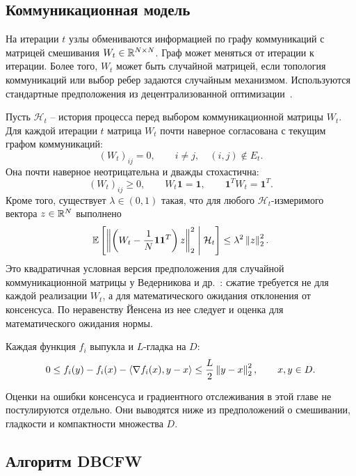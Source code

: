 \subsection{Коммуникационная модель}

На итерации $t$ узлы обмениваются информацией по графу коммуникаций с матрицей смешивания $W_t\in\mathbb{R}^{N\times N}$.
Граф может меняться от итерации к итерации.
Более того, $W_t$ может быть случайной матрицей, если топология коммуникаций или выбор ребер задаются случайным механизмом.
Используются стандартные предположения из децентрализованной оптимизации~\cite{wai2017decentralized,vedernikov2023decentralized}.

\begin{assumption}
\label{ass:dbcfw-mixing}
Пусть $\mathcal H_t$ -- история процесса перед выбором коммуникационной матрицы $W_t$.
Для каждой итерации $t$ матрица $W_t$ почти наверное согласована с текущим графом
коммуникаций:
\[
    (W_t)_{ij}=0,
    \qquad
    i\neq j,\quad (i,j)\notin E_t.
\]
Она почти наверное неотрицательна и дважды стохастична:
\[
    (W_t)_{ij}\geq0,
    \qquad
    W_t\mathbf{1}=\mathbf{1},
    \qquad
    \mathbf{1}^TW_t=\mathbf{1}^T.
\]
Кроме того, существует $\lambda\in(0,1)$ такая, что для любого
$\mathcal H_t$-измеримого вектора $z\in\mathbb{R}^N$ выполнено
\[
    \mathbb{E}\left[
        \left\|
        \left(W_t-\frac{1}{N}\mathbf{1}\mathbf{1}^T\right)z
        \right\|_2^2
        \;\middle|\;\mathcal H_t
    \right]
    \leq
    \lambda^2\left\|z\right\|_2^2.
\]
Это квадратичная условная версия предположения для случайной коммуникационной матрицы
у Ведерникова и др.~\cite{vedernikov2023decentralized}: сжатие требуется не для каждой
реализации $W_t$, а для математического ожидания отклонения от консенсуса.
По неравенству Йенсена из нее следует и оценка для математического ожидания нормы.
\end{assumption}

\begin{assumption}
\label{ass:dbcfw-smooth}
Каждая функция $f_i$ выпукла и $L$-гладка на $D$:
\[
    0
    \leq
    f_i(y)-f_i(x)-\left\langle \nabla f_i(x), y-x \right\rangle
    \leq
    \frac{L}{2}\left\|y-x\right\|_2^2,
    \qquad
    x,y\in D.
\]
\end{assumption}

Оценки на ошибки консенсуса и градиентного отслеживания в этой главе не постулируются
отдельно.
Они выводятся ниже из предположений о смешивании, гладкости и компактности множества $D$.

\subsection{Алгоритм DBCFW}

